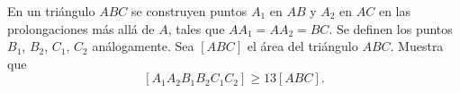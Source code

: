En un triángulo $ABC$ se construyen puntos $A_{1}$ en $AB$ y $A_{2}$ en $AC$ en las prolongaciones más allá de $A$, tales que $AA_{1}=AA_{2}=BC$. Se definen los puntos $B_{1}$, $B_{2}$, $C_{1}$, $C_{2}$ análogamente. Sea $[ABC]$ el área del triángulo $ABC$. Muestra que \[[A_{1}A_{2}B_{1}B_{2}C_{1}C_{2}] \geq 13 [ABC].\]